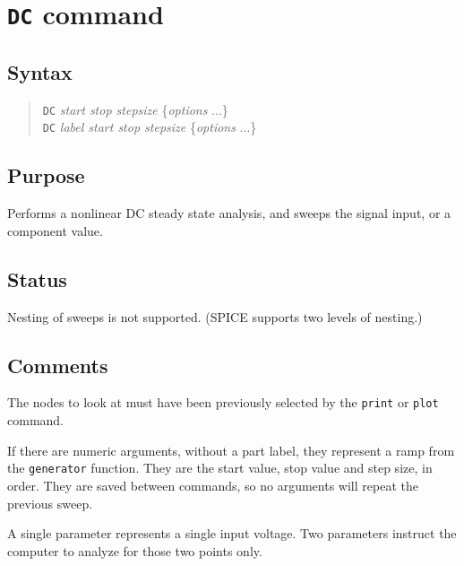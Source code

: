 \section{{\tt DC} command}
\subsection{Syntax}
\begin{verse}
{\tt DC} {\it start stop stepsize} \{{\it options} ...\}\\
{\tt DC} {\it label start stop stepsize} \{{\it options} ...\}
\end{verse}
\subsection{Purpose}

Performs a nonlinear DC steady state analysis, and sweeps the signal input,
or a component value.
\subsection{Status}

Nesting of sweeps is not supported.  (SPICE supports two
levels of nesting.)
\subsection{Comments}

The nodes to look at must have been previously selected by the {\tt print} or
{\tt plot} command.

If there are numeric arguments, without a part label, they represent a ramp
from the {\tt generator} function.  They are the start value, stop value
and step size, in order.  They are saved between commands, so no arguments
will repeat the previous sweep.

A single parameter represents a single input voltage.  Two parameters
instruct the computer to analyze for those two points only.

